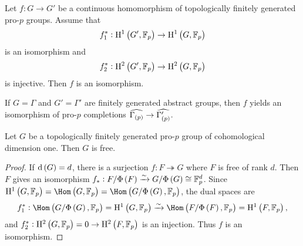 \begin{theorem}
\label{thm:5.4.20}
Let $ f : G \to G' $ be a continuous homomorphism of topologically finitely generated pro-$ p $ groups. Assume that
$$ f_1^* : \H^1\br{G', \FF_p} \to \H^1\br{G, \FF_p} $$
is an isomorphism and
$$ f_2^* : \H^2\br{G', \FF_p} \to \H^2\br{G, \FF_p} $$
is injective. Then $ f $ is an isomorphism.
\end{theorem}

If $ G = \Gamma $ and $ G' = \Gamma' $ are finitely generated abstract groups, then $ f $ yields an isomorphism of pro-$ p $ completions $ \widehat{\Gamma_{\br{p}}} \to \widehat{\Gamma_{\br{p}}'} $.

\pagebreak

\begin{corollary}
Let $ G $ be a topologically finitely generated pro-$ p $ group of cohomological dimension one. Then $ G $ is free.
\end{corollary}

\begin{proof}
If $ \d\br{G} = d $, there is a surjection $ f : F \twoheadrightarrow G $ where $ F $ is free of rank $ d $. Then $ F $ gives an isomorphism $ f_* : F / \Phi\br{F} \xrightarrow{\sim} G / \Phi\br{G} \cong \FF_p^d $. Since $ \H^1\br{G, \FF_p} = \Hom\br{G, \FF_p} = \Hom\br{G / \Phi\br{G}, \FF_p} $, the dual spaces are
$$ f_1^* : \Hom\br{G / \Phi\br{G}, \FF_p} = \H^1\br{G, \FF_p} \xrightarrow{\sim} \Hom\br{F / \Phi\br{F}, \FF_p} = \H^1\br{F, \FF_p}, $$
and $ f_2^* : \H^2\br{G, \FF_p} = 0 \to \H^2\br{F, \FF_p} $ is an injection. Thus $ f $ is an isomorphism.
\end{proof}


